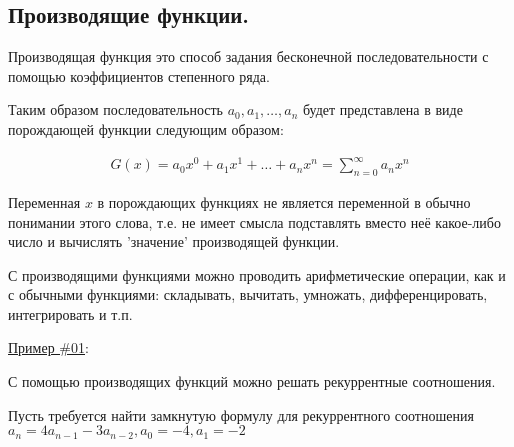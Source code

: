 \subsection{%
  Производящие функции.%
}

\begin{definition}
  Производящая функция это способ задания бесконечной последовательности с
  помощью коэффициентов степенного ряда.
\end{definition}

Таким образом последовательность \(a_{0}, a_{1}, \dotsc, a_{n}\) будет
представлена в виде порождающей функции следующим образом:

\begin{align*}
  G(x)
  = a_{0} x^{0} + a_{1} x^{1} + \dotsc + a_{n} x^{n}
  = \sum_{n = 0}^{\infty} a_{n} x^{n}
\end{align*}

\begin{remark}
  Переменная \(x\) в порождающих функциях не является переменной в обычно
  понимании этого слова, т.е. не имеет смысла подставлять вместо неё какое-либо
  число и вычислять 'значение' производящей функции.
\end{remark}

\begin{remark}
  С производящими функциями можно проводить арифметические операции, как и с
  обычными функциями: складывать, вычитать, умножать, дифференцировать,
  интегрировать и т.п.
\end{remark}

\underline{Пример \#01}:

С помощью производящих функций можно решать рекуррентные соотношения.

Пусть требуется найти замкнутую формулу для рекуррентного соотношения
\(a_{n} = 4 a_{n - 1} - 3 a_{n - 2}, a_{0} = -4, a_{1} = -2\)

